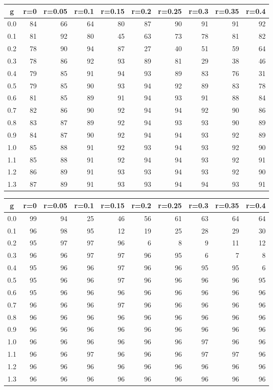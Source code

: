 %
\begin{table}[!tbp]
 \begin{center}
 \begin{tabular}{rrrrrrrrrr}\hline\hline
\multicolumn{1}{c}{g}&\multicolumn{1}{c}{r=0}&\multicolumn{1}{c}{r=0.05}&\multicolumn{1}{c}{r=0.1}&\multicolumn{1}{c}{r=0.15}&\multicolumn{1}{c}{r=0.2}&\multicolumn{1}{c}{r=0.25}&\multicolumn{1}{c}{r=0.3}&\multicolumn{1}{c}{r=0.35}&\multicolumn{1}{c}{r=0.4}\tabularnewline
\hline
0.0&84&66&64&80&87&90&91&91&92\tabularnewline
0.1&81&92&80&45&63&73&78&81&82\tabularnewline
0.2&78&90&94&87&27&40&51&59&64\tabularnewline
0.3&78&86&92&93&89&81&29&38&46\tabularnewline
0.4&79&85&91&94&93&89&83&76&31\tabularnewline
0.5&79&85&90&93&94&92&89&83&78\tabularnewline
0.6&81&85&89&91&94&93&91&88&84\tabularnewline
0.7&82&86&90&92&94&94&92&90&86\tabularnewline
0.8&83&87&89&92&94&93&93&90&89\tabularnewline
0.9&84&87&90&92&94&94&93&92&89\tabularnewline
1.0&85&88&91&92&93&94&93&92&90\tabularnewline
1.1&85&88&91&92&94&94&93&92&91\tabularnewline
1.2&86&89&91&93&93&94&93&92&90\tabularnewline
1.3&87&89&91&93&93&94&94&93&91\tabularnewline
\hline
\end{tabular}

\end{center}

\end{table}

%
\begin{table}[!tbp]
 \begin{center}
 \begin{tabular}{rrrrrrrrrr}\hline\hline
\multicolumn{1}{c}{g}&\multicolumn{1}{c}{r=0}&\multicolumn{1}{c}{r=0.05}&\multicolumn{1}{c}{r=0.1}&\multicolumn{1}{c}{r=0.15}&\multicolumn{1}{c}{r=0.2}&\multicolumn{1}{c}{r=0.25}&\multicolumn{1}{c}{r=0.3}&\multicolumn{1}{c}{r=0.35}&\multicolumn{1}{c}{r=0.4}\tabularnewline
\hline
0.0&99&94&25&46&56&61&63&64&64\tabularnewline
0.1&96&98&95&12&19&25&28&29&30\tabularnewline
0.2&95&97&97&96& 6& 8& 9&11&12\tabularnewline
0.3&96&96&97&97&96&95& 6& 7& 8\tabularnewline
0.4&95&96&96&97&96&96&95&95& 6\tabularnewline
0.5&95&96&96&97&96&96&96&96&95\tabularnewline
0.6&95&96&96&96&96&96&96&96&96\tabularnewline
0.7&96&96&96&97&96&96&96&96&96\tabularnewline
0.8&96&96&96&96&96&96&96&96&96\tabularnewline
0.9&96&96&96&96&96&96&96&96&96\tabularnewline
1.0&96&96&96&96&96&96&97&96&96\tabularnewline
1.1&96&96&97&96&96&96&97&97&96\tabularnewline
1.2&96&96&96&96&96&96&96&96&96\tabularnewline
1.3&96&96&96&96&96&96&96&96&96\tabularnewline
\hline
\end{tabular}

\end{center}

\end{table}

